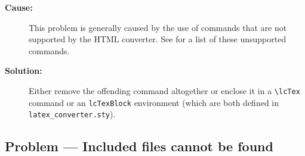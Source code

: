 \begin{description}
\item[{\bf Cause:}] This problem is generally caused by the use of commands
that are not supported by the HTML converter.  See
 for a list of
these unsupported commands.

\item[{\bf Solution:}] Either remove the offending command altogether or enclose
it in a \verb|\lcTex| command or an {\tt lcTexBlock} environment (which are
both defined in {\tt latex\_converter.sty}).
\end{description}

\subsection*{Problem --- Included files cannot be found}

